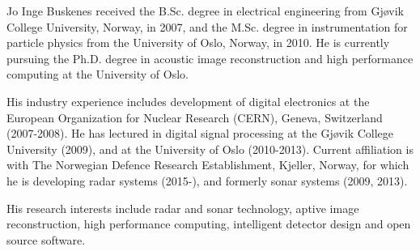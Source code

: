 
\begin{IEEEbiography}{Jo Inge Buskenes}
received the B.Sc. degree in electrical engineering from Gj\o{}vik College University, Norway, in 2007, and the M.Sc. degree in instrumentation for particle physics from the University of Oslo, Norway, in 2010. He is currently pursuing the Ph.D. degree in acoustic image reconstruction and high performance computing at the University of Oslo.

His industry experience includes development of digital electronics at the European Organization for Nuclear Research (CERN), Geneva, Switzerland (2007-2008). He has lectured in digital signal processing at the Gj\o{}vik College University (2009), and at the University of Oslo (2010-2013). Current affiliation is with The Norwegian Defence Research Establishment, Kjeller, Norway, for which he is developing radar systems (2015-), and formerly sonar systems (2009, 2013).

His research interests include radar and sonar technology, aptive image reconstruction, high performance computing, intelligent detector design and open source software.
\end{IEEEbiography}